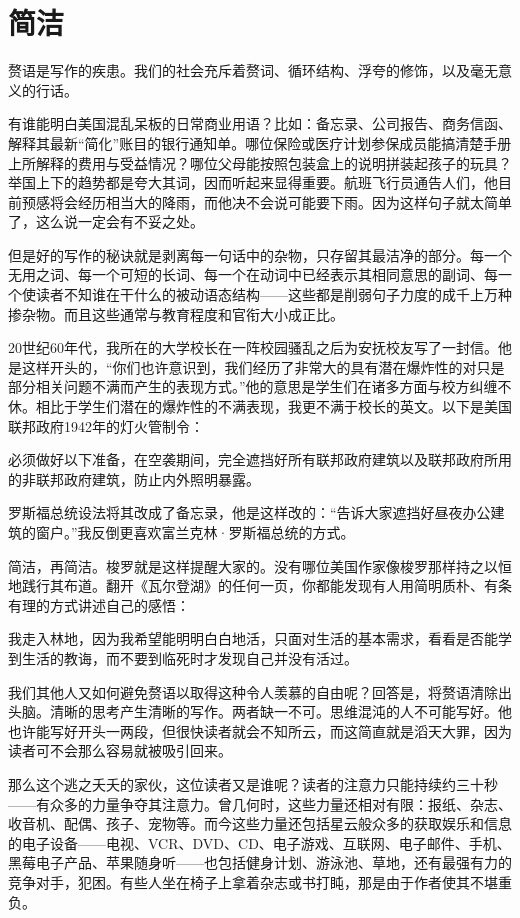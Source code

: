 \chapter{简洁}
赘语是写作的疾患。我们的社会充斥着赘词、循环结构、浮夸的修饰，以及毫无意义的行话。

有谁能明白美国混乱呆板的日常商业用语？比如：备忘录、公司报告、商务信函、解释其最新“简化”账目的银行通知单。哪位保险或医疗计划参保成员能搞清楚手册上所解释的费用与受益情况？哪位父母能按照包装盒上的说明拼装起孩子的玩具？举国上下的趋势都是夸大其词，因而听起来显得重要。航班飞行员通告人们，他目前预感将会经历相当大的降雨，而他决不会说可能要下雨。因为这样句子就太简单了，这么说一定会有不妥之处。

但是好的写作的秘诀就是剥离每一句话中的杂物，只存留其最洁净的部分。每一个无用之词、每一个可短的长词、每一个在动词中已经表示其相同意思的副词、每一个使读者不知谁在干什么的被动语态结构——这些都是削弱句子力度的成千上万种掺杂物。而且这些通常与教育程度和官衔大小成正比。

20世纪60年代，我所在的大学校长在一阵校园骚乱之后为安抚校友写了一封信。他是这样开头的，“你们也许意识到，我们经历了非常大的具有潜在爆炸性的对只是部分相关问题不满而产生的表现方式。”他的意思是学生们在诸多方面与校方纠缠不休。相比于学生们潜在的爆炸性的不满表现，我更不满于校长的英文。以下是美国联邦政府1942年的灯火管制令：

必须做好以下准备，在空袭期间，完全遮挡好所有联邦政府建筑以及联邦政府所用的非联邦政府建筑，防止内外照明暴露。

罗斯福总统设法将其改成了备忘录，他是这样改的：“告诉大家遮挡好昼夜办公建筑的窗户。”我反倒更喜欢富兰克林·罗斯福总统的方式。

简洁，再简洁。梭罗就是这样提醒大家的。没有哪位美国作家像梭罗那样持之以恒地践行其布道。翻开《瓦尔登湖》的任何一页，你都能发现有人用简明质朴、有条有理的方式讲述自己的感悟：

我走入林地，因为我希望能明明白白地活，只面对生活的基本需求，看看是否能学到生活的教诲，而不要到临死时才发现自己并没有活过。

我们其他人又如何避免赘语以取得这种令人羡慕的自由呢？回答是，将赘语清除出头脑。清晰的思考产生清晰的写作。两者缺一不可。思维混沌的人不可能写好。他也许能写好开头一两段，但很快读者就会不知所云，而这简直就是滔天大罪，因为读者可不会那么容易就被吸引回来。

那么这个逃之夭夭的家伙，这位读者又是谁呢？读者的注意力只能持续约三十秒——有众多的力量争夺其注意力。曾几何时，这些力量还相对有限：报纸、杂志、收音机、配偶、孩子、宠物等。而今这些力量还包括星云般众多的获取娱乐和信息的电子设备——电视、VCR、DVD、CD、电子游戏、互联网、电子邮件、手机、黑莓电子产品、苹果随身听——也包括健身计划、游泳池、草地，还有最强有力的竞争对手，犯困。有些人坐在椅子上拿着杂志或书打盹，那是由于作者使其不堪重负。

